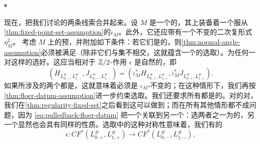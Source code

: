 \paragraph{\trEquivariant\trFukayaCategory{}。}\label{sub:equivariant-fukaya-category}
现在，把我们讨论的两条线索合并起来。设 $M$ 是一个\trCorneredBoundary{}的\trExactSymplectic\trManifold，其上装备着一个服从\cref{thm:fixed-point-set-assumption}的\trInvolution{}$\iota_M$。此外，它还应带有一个不变的二次复\trVolume{}形式 $\eta_M^2$。
考虑 $M$ 上的预\trEquivariant\trExact\trLagrange\trBrane{}，并附加如下条件：若它们是\trEquivariant{}的，则\cref{thm:normal-angle-assumption}必须被满足（除非它们与\trFixedPoint{}集不相交，这就蕴含一个\trNormalAngle{}的选取）。为任何一对这样的\trBrane{}选好\trFloerDatum{}。这应当相对于 $\mathbb{Z}/2$-作用 $\epsilon$ 是自然的，即
\begin{equation}\label{eq:pulledback-floer-datum}
(H_{L^{\#}_{0,-},L^{\#}_{1,-}},J_{L^{\#}_{0,-},L^{\#}_{1,-}})
=(\iota_M^*H_{L^{\#}_{0,+},L^{\#}_{1,+}},\iota_M^*J_{L^{\#}_{0,+},L^{\#}_{1,+}}).
\end{equation}
如果所涉及的两个\trBrane{}都是\trEquivariant\trBrane{}，这就意味着\trFloerDatum{}必须是 $\iota_M$-不变的；在这种情形下，我们再按\cref{thm:floer-datum-assumption}进一步约束选取。我们还要求所有\trFloerDatum{}都是\trRegular{}的。对\trEquivariant\trBrane{}的对，我们在\cref{thm:regularity-fixed-set}之后看到这可以做到；而在所有其他情形都不成问题，因为 \eqref{eq:pulledback-floer-datum} 把一个\trFloerDatum{}关联到另一个：选两者之一为\trRegular{}的，另一个显然也会具有同样的性质。\trFloerDatum{}选取中的这种对称性意味着，我们有\trCanonical{}的\trIsomorphism
\begin{equation}\label{eq:epsilon-chain-isomorphism}
\epsilon\colon CF^*(L^{\#}_{0,+},L^{\#}_{1,+})\longrightarrow CF^*(L^{\#}_{0,-},L^{\#}_{1,-}),
\end{equation}
